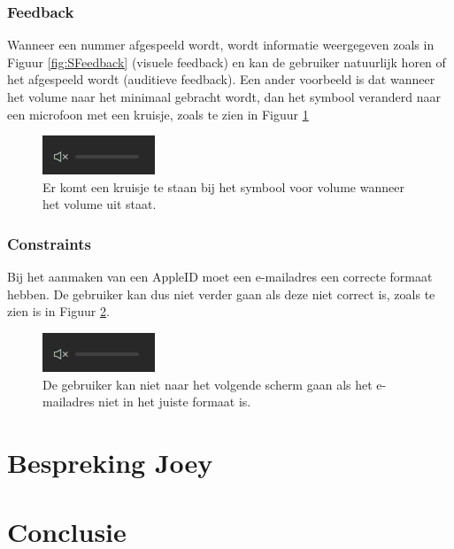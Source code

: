 \documentclass[11pt]{article}
\begin{document}
\subsubsection{Feedback}
Wanneer een nummer afgespeeld wordt, wordt informatie weergegeven zoals in Figuur \ref{fig:SFeedback} (visuele feedback) en kan de gebruiker natuurlijk horen of het afgespeeld wordt (auditieve feedback). Een ander voorbeeld is dat wanneer het volume naar het minimaal gebracht wordt, dan het symbool veranderd naar een microfoon met een kruisje, zoals te zien in Figuur \ref{fig:SVolumeOff}
\begin{figure}
	\centering
	\includegraphics[width=0.5\linewidth]{SVolumeOff}
	\caption{Er komt een kruisje te staan bij het symbool voor volume wanneer het volume uit staat.}
	\label{fig:SVolumeOff}
\end{figure}
\subsubsection{Constraints}
Bij het aanmaken van een AppleID moet een e-mailadres een correcte formaat hebben. De gebruiker kan dus niet verder gaan als deze niet correct is, zoals te zien is in Figuur \ref{fig:IEmail}.
\begin{figure}
	\centering
	\includegraphics[width=0.9\linewidth]{IEmail}
	\caption{De gebruiker kan niet naar het volgende scherm gaan als het e-mailadres niet in het juiste formaat is.}
	\label{fig:IEmail}
\end{figure}

\section{Bespreking Joey}

\section{Conclusie}
\end{document}
